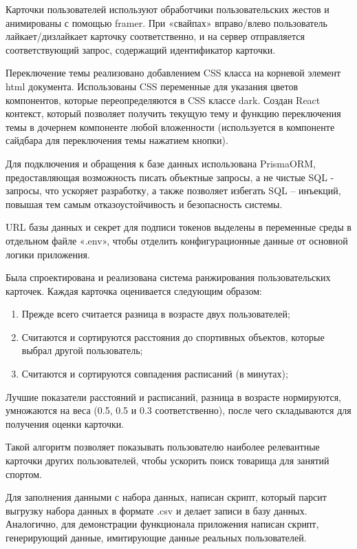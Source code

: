 \documentclass[14pt]{article}
\begin{document}
Карточки пользователей используют обработчики пользовательских жестов и анимированы
с помощью framer. При «свайпах» вправо/влево пользователь лайкает/дизлайкает карточку
соответственно, и на сервер отправляется соответствующий запрос, содержащий идентификатор карточки.

Переключение темы реализовано добавлением CSS класса на корневой элемент html документа.
Использованы CSS переменные для указания цветов компонентов, которые переопределяются в CSS классе
dark. Создан React контекст, который позволяет получить текущую тему и функцию переключения темы в
дочернем компоненте любой вложенности (используется в компоненте сайдбара для переключения темы нажатием кнопки).

Для подключения и обращения к базе данных использована PrismaORM, предоставляющая возможность писать объектные
запросы, а не чистые SQL - запросы, что ускоряет разработку, а также позволяет избегать SQL – инъекций, повышая
тем самым отказоустойчивость и безопасность системы.

URL базы данных и секрет для подписи токенов выделены в переменные среды в
отдельном файле «.env», чтобы отделить конфигурационные данные от основной
логики приложения.

Была спроектирована и реализована система ранжирования пользовательских карточек. Каждая карточка оценивается следующим образом:
\begin{enumerate}
	\item Прежде всего считается разница в возрасте двух пользователей;
	\item Считаются и сортируются расстояния до спортивных объектов, которые выбрал другой пользователь;
	\item Считаются и сортируются совпадения расписаний (в минутах);
\end{enumerate}
Лучшие показатели расстояний и расписаний, разница в возрасте нормируются, умножаются на веса (0.5, 0.5 и 0.3 соответственно), после чего складываются для получения оценки карточки.

Такой алгоритм позволяет показывать пользователю наиболее релевантные карточки других пользователей, чтобы ускорить поиск товарища для занятий спортом.

Для заполнения данными с набора данных, написан скрипт, который парсит выгрузку набора данных в формате .csv и делает записи в базу данных.
Аналогично, для демонстрации функционала приложения написан скрипт, генерирующий данные, имитирующие данные реальных пользователей.
\end{document}
